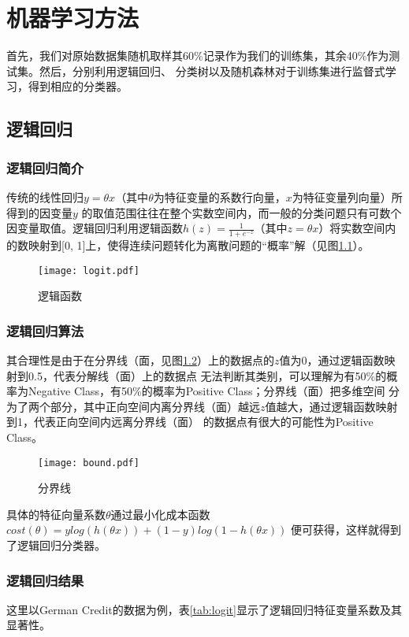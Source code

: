 \chapter{机器学习方法}

首先，我们对原始数据集随机取样其60\%记录作为我们的训练集，其余40\%作为测试集。然后，分别利用逻辑回归、
分类树以及随机森林对于训练集进行监督式学习，得到相应的分类器。

\section{逻辑回归}
\subsection{逻辑回归简介}

传统的线性回归$y = \theta x$（其中$\theta$为特征变量的系数行向量，$x$为特征变量列向量）所得到的因变量$y$
的取值范围往往在整个实数空间内，而一般的分类问题只有可数个因变量取值。逻辑回归利用逻辑函数$h(z) = \frac{1}{1+e^{-z}}$（其中$z=\theta x$）将实数空间内的数映射到[0, 1]上，使得连续问题转化为离散问题的``概率''解（见图\ref{fig:logistic}）。

\begin{figure}
\centering
\texttt{[image: logit.pdf]}
\caption{\label{fig:logistic}逻辑函数}
\end{figure}

\subsection{逻辑回归算法}
其合理性是由于在分界线（面，见图\ref{fig:bound}）上的数据点的$z$值为0，通过逻辑函数映射到0.5，代表分解线（面）上的数据点
无法判断其类别，可以理解为有50\%的概率为Negative Class，有50\%的概率为Positive Class；分界线（面）把多维空间
分为了两个部分，其中正向空间内离分界线（面）越远$z$值越大，通过逻辑函数映射到1，代表正向空间内远离分界线（面）
的数据点有很大的可能性为Positive Class。

\begin{figure}
\centering
\texttt{[image: bound.pdf]}
\caption{\label{fig:bound}分界线}
\end{figure}

具体的特征向量系数$\theta$通过最小化成本函数$cost(\theta) = y log(h(\theta x)) + (1-y) log(1-h(\theta x))$
便可获得，这样就得到了逻辑回归分类器。

\subsection{逻辑回归结果}
这里以German Credit的数据为例，表\ref{tab:logit}显示了逻辑回归特征变量系数及其显著性。

